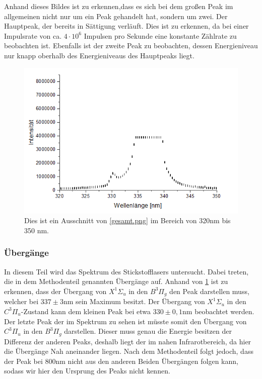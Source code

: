 \documentclass[
	a4paper,
	12pt,
	pagesize,
	ngerman
]{scrartcl}
\begin{document}
Anhand dieses Bildes ist zu erkennen,dass es sich bei dem großen Peak im allgemeinen nicht nur um ein Peak gehandelt hat, sondern um zwei. Der Hauptpeak, der bereits in Sättigung verläuft. Dies ist zu erkennen, da bei einer Impulsrate von ca. $4 \cdot 10^6$ Impulsen pro Sekunde eine konstante Zählrate zu beobachten ist. Ebenfalls ist der zweite Peak zu beobachten, dessen Energieniveau nur knapp oberhalb des Energieniveaus des Hauptpeaks liegt.
\begin{figure}[h!]
	\centering
	\includegraphics[scale = 1.5]{fitbilfuns.png}
	\caption{Dies ist ein Ausschnitt von \cref{gesamt.png} im Bereich von 320nm bis 350 nm.}
	\label{naherpeak}
\end{figure}

\subsubsection{Übergänge}
In diesem Teil wird das Spektrum des Stickstofflasers untersucht. Dabei treten, die in dem Methodenteil genannten Übergänge auf. Anhand von \cref{naherpeak} ist zu erkennen, dass der Übergang von $X^1\Sigma_u$ in den $B^3\Pi_g$ den Peak darstellen muss, welcher bei $337 \pm 3$nm sein Maximum besitzt. Der Übergang von 
$X^1\Sigma_u$ in den $C^3\Pi_u$-Zustand kann dem kleinen Peak bei etwa $330 \pm 0,1$nm beobachtet werden. Der letzte Peak der im Spektrum zu sehen ist müsste somit den Übergang von $C^3\Pi_u$ in den $B^3\Pi_g$ darstellen. Dieser muss genau die Energie besitzen der Differenz der anderen Peaks, deshalb liegt der im nahen Infrarotbereich, da hier die Übergänge Nah aneinander liegen. Nach dem Methodenteil folgt jedoch, dass der Peak bei $800$nm nicht aus den anderen Beiden Übergängen folgen kann, sodass wir hier den Ursprung des Peaks nicht kennen. 
\end{document}
